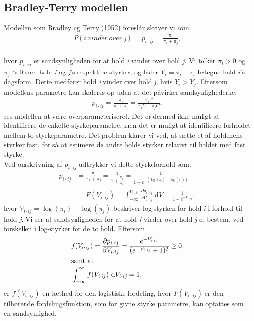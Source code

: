 \documentclass[11pt,a4paper]{article}
\begin{document}
\subsection{Bradley-Terry modellen}
Modellen som Bradley og Terry (1952)\cite{BradleyTerry} foreslår skriver vi som:
\begin{align*}
    P(i\ vinder\ over\ j) = p_{i\cdot ij} = \frac{\pi_i}{\pi_i+\pi_j},
\end{align*}
\\
hvor $p_{i\cdot ij}$ er sandsynligheden for at hold \textit{i} vinder over hold \textit{j}. Vi tolker $\pi_i>0$ og $\pi_j>0$ som hold \textit{i} og \textit{j}'s respektive styrker, og lader $Y_i=\pi_i+\epsilon_i$ betegne hold \textit{i}'s dagsform. Dette medfører hold \textit{i} vinder over hold \textit{j}, hvis $Y_i>Y_j$. 
Eftersom modellens parametre kan skaleres op uden at det påvirker sandsynlighederne:
\begin{align*}
p_{i\cdot ij} = \frac{\pi_i}{\pi_i+\pi_j} = \frac{\pi_iC}{\pi_iC+\pi_jC},
\end{align*}
ses modellen at være overparameteriseret. Det er dermed ikke muligt at identificere de enkelte styrkeparametre, men det er muligt at identificere forholdet mellem to styrkeparametre. Det problem klarer vi ved, at sætte et af holdenens styrker fast, for så at estimere de andre holds styrker relativt til holdet med fast styrke.\\
Ved omskrivning af $p_{i\cdot ij}$ udtrykker vi dette styrkeforhold som:
\begin{align*}
    p_{i\cdot ij} &= \frac{\pi_i}{\pi_i+\pi_j}=\frac{1}{1+\frac{\pi_j}{\pi_i}}=\frac{1}{1+e^{-(\log(\pi_i)-\log(\pi_j))}}\\
    &=F(V_{i\cdot ij})=\int_{-\infty}^{V_{i\cdot ij}} \frac{\partial p_{i\cdot ij}}{\partial V_{i\cdot ij}} \text{ d}V=\frac{1}{1+e^{-V_{i\cdot ij}}},
\end{align*}
hvor $V_{i\cdot ij}=\log(\pi_i)-\log(\pi_j)$ beskriver log-styrken for hold \textit{i} i forhold til hold \textit{j}. Vi ser at sandsynligheden for at hold \textit{i} vinder over hold \textit{j} er bestemt ved forskellen i log-styrker for de to hold. Eftersom 
\begin{align*}
&f(V_{i\cdot ij})=\frac{\partial p_{i\cdot ij}}{\partial V_{i\cdot ij}} = \frac{e^{-V_{i\cdot ij}}}{(e^{-V_{i\cdot ij}}+1)^2} \geq 0, \\ 
\intertext{samt at}
&\int_{-\infty}^\infty f(V_{i\cdot ij}) \text{  d} V_{i\cdot ij} = 1,
\end{align*}
er $f(V_{i\cdot ij})$ en tæthed for den logistiske fordeling, hvor $F(V_{i\cdot ij})$ er den tilhørende fordelingsfunktion, som for givne styrke parametre, kan opfattes som en sandsynlighed.\\
\end{document}
